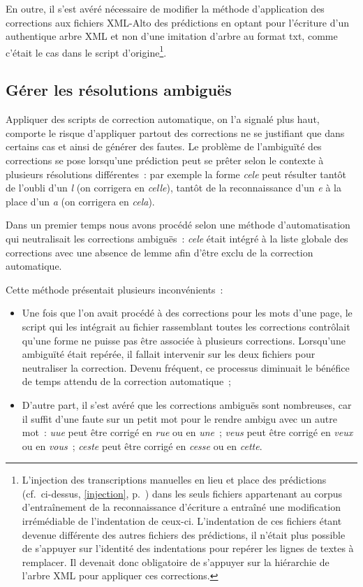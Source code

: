 \documentclass[a4paper,12pt,twoside]{book}
\begin{document}
				En outre, il s'est avéré nécessaire de modifier la méthode d'application des corrections aux fichiers XML-Alto des prédictions en optant pour l'écriture d'un authentique arbre XML et non d'une imitation d'arbre au format \textsf{txt}, comme c'était le cas dans le script d'origine\footnote{L'injection des transcriptions manuelles en lieu et place des prédictions (cf.~ci-dessus, \ref{injection}, p.~\pageref{injection}) dans les seuls fichiers appartenant au corpus d'entraînement de la reconnaissance d'écriture a entraîné une modification irrémédiable de l'indentation de ceux-ci. L'indentation de ces fichiers étant devenue différente des autres fichiers des prédictions, il n'était plus possible de s'appuyer sur l'identité des indentations pour repérer les lignes de textes à remplacer. Il devenait donc obligatoire de s'appuyer sur la hiérarchie de l'arbre XML pour appliquer ces corrections.}.
								
			\subsection{Gérer les résolutions ambiguës}
				Appliquer des scripts de correction automatique, on l'a signalé plus haut, comporte le risque d'appliquer partout des corrections ne se justifiant que dans certains cas et ainsi de générer des fautes. Le problème de l'ambiguïté des corrections se pose lorsqu'une prédiction peut se prêter selon le contexte à plusieurs résolutions différentes~: par exemple la forme \textit{cele} peut résulter tantôt de l'oubli d'un \textit{l} (on corrigera en \textit{celle}), tantôt de la reconnaissance d'un \textit{e} à la place d'un \textit{a} (on corrigera en \textit{cela}).
							
				Dans un premier temps nous avons procédé selon une méthode d'automatisation qui neutralisait les corrections ambiguës~: \textit{cele} était intégré à la liste globale des corrections avec une absence de lemme afin d'être exclu de la correction automatique.
				
				Cette méthode présentait plusieurs inconvénients~:

				\begin{itemize}
					\item Une fois que l'on avait procédé à des corrections pour les mots d'une page, le script qui les intégrait au fichier rassemblant toutes les corrections contrôlait qu'une forme ne puisse pas être associée à plusieurs corrections. Lorsqu'une ambiguïté était repérée, il fallait intervenir sur les deux fichiers pour neutraliser la correction. Devenu fréquent, ce processus diminuait le bénéfice de temps attendu de la correction automatique~;

					\item D'autre part, il s'est avéré que les corrections ambiguës sont nombreuses, car il suffit d'une faute sur un petit mot pour le rendre ambigu avec un autre mot~: \textit{uue} peut être corrigé en \textit{rue} ou en \textit{une}~; \textit{veus} peut être corrigé en \textit{veux} ou en \textit{vous}~; \textit{ceste} peut être corrigé en \textit{cesse} ou en \textit{cette}.
				
				\end{itemize}
				
\end{document}
